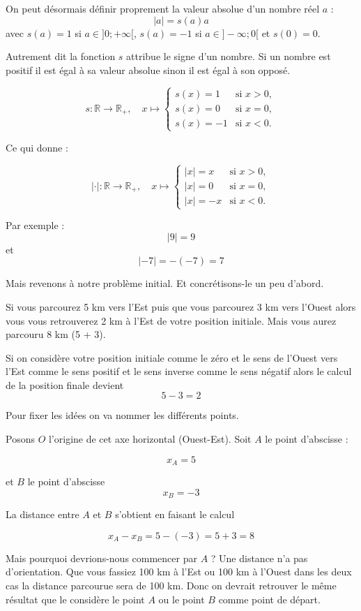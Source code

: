 \documentclass[a4paper,11pt]{book}
\begin{document}
On peut désormais définir proprement la valeur absolue d'un nombre
réel \(a\) : \[\lvert a \rvert = s(a)a\] avec \(s(a) = 1\) si \(a\in ]0 ;
   +\infty[\), \(s(a) = -1\) si \(a\in ]-\infty ; 0[\) et \(s(0) =
0\).

Autrement dit la fonction \(s\) attribue le signe d'un nombre. Si
un nombre est positif il est égal à sa valeur absolue sinon il est
égal à son opposé.

\[
s : \mathbb{R} \to \mathbb{R}_{+},\quad x \mapsto
\begin{cases}
s(x) = 1   & \text{si } x > 0, \\
s(x) = 0   & \text{si } x = 0, \\
s(x) = -1  & \text{si } x < 0.
\end{cases}
\]

Ce qui donne :

\[
\lvert\cdot\rvert : \mathbb{R} \to \mathbb{R}_{+},\quad x \mapsto
\begin{cases}
\lvert x \rvert = x   & \text{si } x > 0, \\
\lvert x \rvert = 0   & \text{si } x = 0, \\
\lvert x \rvert = -x  & \text{si } x < 0.
\end{cases}
\]


Par exemple :
\[\lvert 9 \rvert = 9\]
et
\[\lvert -7\rvert = -(-7) = 7\]

Mais revenons à notre problème initial. Et concrétisons-le un peu
d'abord.

Si vous parcourez 5 km vers l'Est puis que vous parcourez
3 km vers l'Ouest alors vous vous retrouverez 2 km à l'Est de votre
position initiale. Mais vous aurez parcouru 8 km (5 + 3).

Si on considère votre position initiale comme le zéro et le sens de
l'Ouest vers l'Est comme le sens positif et le sens inverse comme le
sens négatif alors le calcul de la position finale devient
\[5 - 3 = 2\]

Pour fixer les idées on va nommer les différents points.

Posons \(O\) l'origine de cet axe horizontal (Ouest-Est).
Soit \(A\) le point d'abscisse :

\[x_A = 5\]

et \(B\) le point d'abscisse
\[x_B = -3\]

La distance entre \(A\) et \(B\) s'obtient en faisant le calcul

\[x_A - x_B = 5 - (-3) = 5 + 3 = 8\]

Mais pourquoi devrions-nous commencer par \(A\) ? Une distance n'a pas
d'orientation. Que vous fassiez 100 km à l'Est ou 100 km à l'Ouest
dans les deux cas la distance parcourue sera de 100 km. Donc on
devrait retrouver le même résultat que le considère le point \(A\) ou
le point \(B\) comme point de départ.
\end{document}
